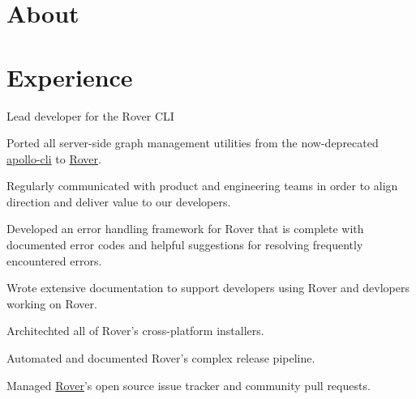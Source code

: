 \documentclass[]{deedy-resume-openfont}
\begin{document}
%
%

%
%



\section{About}

\section{Experience}

\vspace{\topsep}
Lead developer for the Rover CLI
\begin{tightemize}
\item Ported all server-side graph management utilities from the now-deprecated \href{https://github.com/apollographql/apollo-tooling}{apollo-cli} to \href{https://github.com/apollographql/rover}{Rover}.
\item Regularly communicated with product and engineering teams in order to align direction and deliver value to our developers.
\item Developed an error handling framework for Rover that is complete with documented error codes and helpful suggestions for resolving frequently encountered errors.
\item Wrote extensive documentation to support developers using Rover and devlopers working on Rover.
\item Architechted all of Rover's cross-platform installers.
\item Automated and documented Rover's complex release pipeline.
\item Managed \href{https://github.com/apollographql/rover}{Rover}'s open source issue tracker and community pull requests.
\end{tightemize}
\sectionsep
\end{document}
